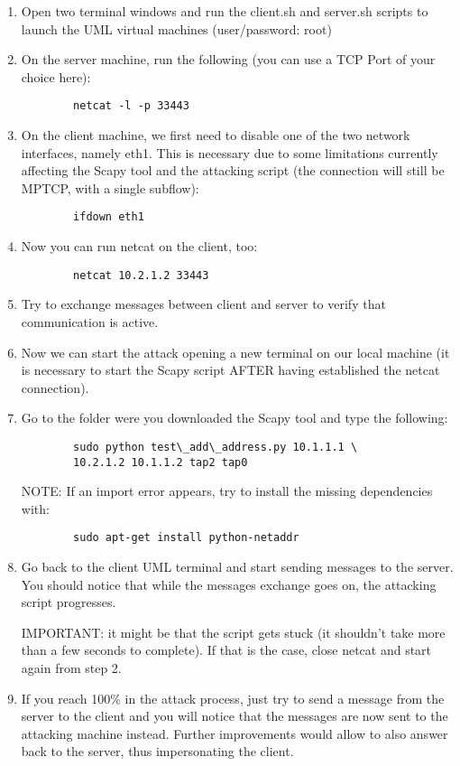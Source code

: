 \begin{enumerate}
\item
    Open two terminal windows and run the client.sh and server.sh scripts to launch the UML virtual machines (user/password: root)
\item
    On the server machine, run the following (you can use a TCP Port of your choice here):
\begin{verbatim}
        netcat -l -p 33443
\end{verbatim}
\item
    On the client machine, we first need to disable one of the two network interfaces, namely eth1. This is necessary due to some limitations currently affecting the Scapy tool and the attacking script (the connection will still be MPTCP, with a single subflow):
\begin{verbatim}
        ifdown eth1
\end{verbatim}
\item
    Now you can run netcat on the client, too:
\begin{verbatim}
        netcat 10.2.1.2 33443
\end{verbatim}
\item
    Try to exchange messages between client and server to verify that communication is active.
\item
    Now we can start the attack opening a new terminal on our local machine (it is necessary to start the Scapy script AFTER having established the netcat connection).
\item
    Go to the folder were you downloaded the Scapy tool and type the following:
\begin{verbatim}
        sudo python test\_add\_address.py 10.1.1.1 \
        10.2.1.2 10.1.1.2 tap2 tap0
\end{verbatim}

    NOTE: If an import error appears, try to install the missing dependencies with:
\begin{verbatim}
        sudo apt-get install python-netaddr
\end{verbatim}
\item
    Go back to the client UML terminal and start sending messages to the server. You should notice that while the messages exchange goes on, the attacking script progresses. 
    
    IMPORTANT: it might be that the script gets stuck (it shouldn't take more than a few seconds to complete). If that is the case, close netcat and start again from step 2.
\item
    If you reach 100\% in the attack process, just try to send a message from the server to the client and you will notice that the messages are now sent to the attacking machine instead. Further improvements would allow to also answer back to the server, thus impersonating the client.
\end{enumerate} 


